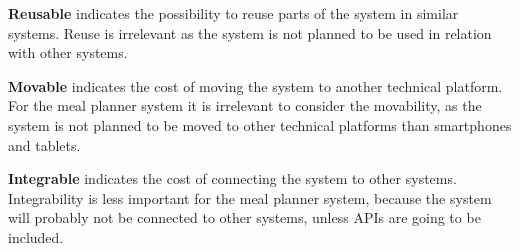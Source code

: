 \textbf{Reusable} indicates the possibility to reuse parts of the system in similar systems. Reuse is irrelevant as the system is not planned to be used in relation with other systems.

\textbf{Movable} indicates the cost of moving the system to another technical platform. For the meal planner system it is irrelevant to consider the movability, as the system is not planned to be moved to other technical platforms than smartphones and tablets.

\textbf{Integrable} indicates the cost of connecting the system to other systems. Integrability is less important for the meal planner system, because the system will probably not be connected to other systems, unless APIs are going to be included.
